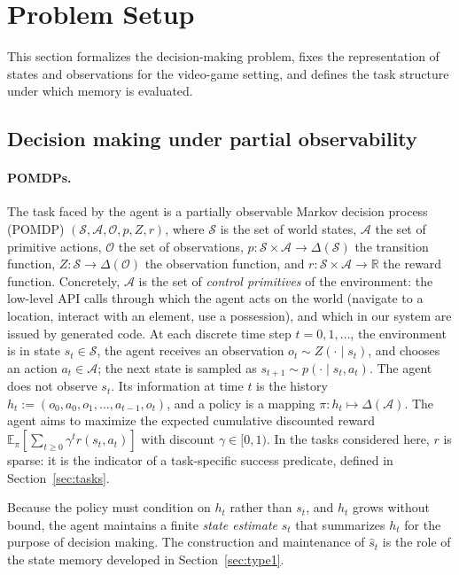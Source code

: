 \documentclass[11pt]{article}
\newcommand{\calS}{\mathcal{S}}
\newcommand{\calA}{\mathcal{A}}
\newcommand{\calO}{\mathcal{O}}
\newcommand{\shat}{\hat{s}}
\begin{document}
\section{Problem Setup}
\label{sec:setup}

This section formalizes the decision-making problem, fixes the representation of states and observations for the video-game setting, and defines the task structure under which memory is evaluated.

\subsection{Decision making under partial observability}
\label{sec:pomdp}

\paragraph{POMDPs.}
The task faced by the agent is a partially observable Markov decision process (POMDP) $(\calS, \calA, \calO, p, Z, r)$, where $\calS$ is the set of world states, $\calA$ the set of primitive actions, $\calO$ the set of observations, $p:\calS\times\calA\to\Delta(\calS)$ the transition function, $Z:\calS\to\Delta(\calO)$ the observation function, and $r:\calS\times\calA\to\mathbb{R}$ the reward function. Concretely, $\calA$ is the set of \emph{control primitives} of the environment: the low-level API calls through which the agent acts on the world (navigate to a location, interact with an element, use a possession), and which in our system are issued by generated code. At each discrete time step $t=0,1,\dots$, the environment is in state $s_t\in\calS$, the agent receives an observation $o_t\sim Z(\cdot\mid s_t)$, and chooses an action $a_t\in\calA$; the next state is sampled as $s_{t+1}\sim p(\cdot\mid s_t,a_t)$. The agent does not observe $s_t$. Its information at time $t$ is the history $h_t := (o_0,a_0,o_1,\dots,a_{t-1},o_t)$, and a policy is a mapping $\pi: h_t\mapsto \Delta(\calA)$. The agent aims to maximize the expected cumulative discounted reward $\mathbb{E}_\pi[\sum_{t\ge 0}\gamma^t r(s_t,a_t)]$ with discount $\gamma\in[0,1)$. In the tasks considered here, $r$ is sparse: it is the indicator of a task-specific success predicate, defined in Section~\ref{sec:tasks}.

Because the policy must condition on $h_t$ rather than $s_t$, and $h_t$ grows without bound, the agent maintains a finite \emph{state estimate} $\shat_t$ that summarizes $h_t$ for the purpose of decision making. The construction and maintenance of $\shat_t$ is the role of the state memory developed in Section~\ref{sec:type1}.
\end{document}
